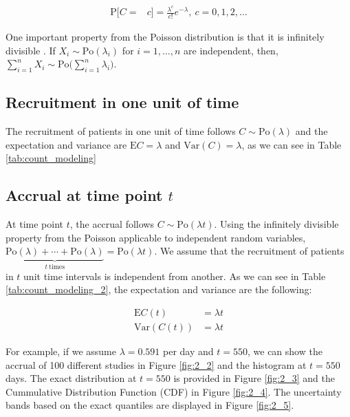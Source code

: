 \begin{align*}
\textrm{P}[C=&c] = \frac{\lambda^c}{c!}e^{-\lambda}, \ c = 0,1,2,\ldots
\end{align*}


One important property from the Poisson distribution is that it is infinitely divisible \citep{held2014applied}. If $X_i\sim \textrm{Po} (\lambda_i)$ for $i=1,\ldots, n$ are independent, then, $\sum_{i=1}^n X_i \sim \textrm{Po} \Big( \sum_{i=1}^n \lambda_i \Big)$.

\subsection{Recruitment in one unit of time}

The recruitment of patients in one unit of time follows $C\sim \textrm{Po} (\lambda)$ and the expectation and variance are
$\textrm{E}C = \lambda$ and $\textrm{Var}(C) = \lambda$, as we can see in Table \ref{tab:count_modeling}

\subsection{Accrual at time point $t$}
At time point $t$, the accrual follows $C\sim \textrm{Po} (\lambda t)$. Using the infinitely divisible property from the Poisson applicable to independent random variables, $\underbrace{\textrm{Po} (\lambda) +\cdots +\textrm{Po} (\lambda)}_{t \ \text{times}} = \textrm{Po} (\lambda t)$. We assume that the recruitment of patients in $t$ unit time intervals is independent from another. As we can see in Table \ref{tab:count_modeling_2}, the expectation and variance are the following:

\begin{align*}
\textrm{E}C(t) & = \lambda t \\
\textrm{Var}(C(t)) & = \lambda t
\end{align*}

For example, if we assume $\lambda = 0.591$ per day and $t=550$, we can show the accrual of 100 different studies in Figure \ref{fig:2_2} and the histogram at $t=550$ days. The exact distribution at $t=550$ is provided in Figure \ref{fig:2_3} and the Cummulative Distribution Function (CDF) in Figure \ref{fig:2_4}. The uncertainty bands based on the exact quantiles are displayed in Figure \ref{fig:2_5}.

